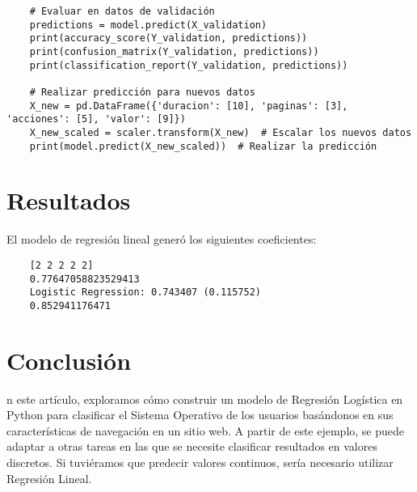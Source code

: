\documentclass{article}
\begin{document}
\begin{verbatim}
    # Evaluar en datos de validación
    predictions = model.predict(X_validation)
    print(accuracy_score(Y_validation, predictions))
    print(confusion_matrix(Y_validation, predictions))
    print(classification_report(Y_validation, predictions))
    
    # Realizar predicción para nuevos datos
    X_new = pd.DataFrame({'duracion': [10], 'paginas': [3], 'acciones': [5], 'valor': [9]})
    X_new_scaled = scaler.transform(X_new)  # Escalar los nuevos datos
    print(model.predict(X_new_scaled))  # Realizar la predicción
\end{verbatim}

\section{Resultados}
El modelo de regresi\'on lineal gener\'o los siguientes coeficientes:
\begin{verbatim}
    [2 2 2 2 2]
    0.77647058823529413     
    Logistic Regression: 0.743407 (0.115752)
    0.852941176471
\end{verbatim}

\section{Conclusi\'on}
n este artículo, exploramos cómo construir un modelo de Regresión Logística en Python para clasificar el Sistema Operativo de los usuarios basándonos en sus características de navegación en un sitio web. A partir de este ejemplo, se puede adaptar a otras tareas en las que se necesite clasificar resultados en valores discretos. Si tuviéramos que predecir valores continuos, sería necesario utilizar Regresión Lineal.
\end{document}
